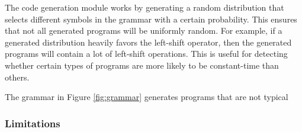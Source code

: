The code generation module works by generating a random distribution that selects different symbols in the grammar with a certain probability.
This ensures that not all generated programs will be uniformly random.
For example, if a generated distribution heavily favors the left-shift operator, then the generated programs will contain a lot of left-shift operations.
This is useful for detecting whether certain types of programs are more likely to be constant-time than others.

The grammar in Figure \ref{fig:grammar} generates programs that are not typical 

\subsubsection{Limitations}
